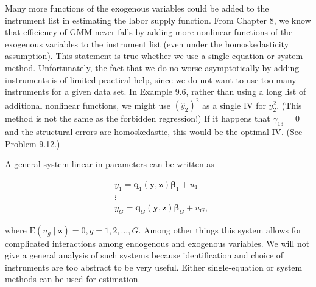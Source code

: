 \documentclass[10pt]{article}
\begin{document}
Many more functions of the exogenous variables could be added to the instrument list in estimating the labor supply function. From Chapter 8, we know that efficiency of GMM never falls by adding more nonlinear functions of the exogenous variables to the instrument list (even under the homoskedasticity assumption). This statement is true whether we use a single-equation or system method. Unfortunately, the fact that we do no worse asymptotically by adding instruments is of limited practical help, since we do not want to use too many instruments for a given data set. In Example 9.6, rather than using a long list of additional nonlinear functions, we might use $\left(\hat{y}_{2}\right)^{2}$ as a single IV for $y_{2}^{2}$. (This method is not the same as the forbidden regression!) If it happens that $\gamma_{13}=0$ and the structural errors are homoskedastic, this would be the optimal IV. (See Problem 9.12.)

A general system linear in parameters can be written as


\begin{align*}
& y_{1}=\mathbf{q}_{1}(\mathbf{y}, \mathbf{z}) \boldsymbol{\beta}_{1}+u_{1} \\
& \vdots  \tag{9.63}\\
& y_{G}=\mathbf{q}_{G}(\mathbf{y}, \mathbf{z}) \boldsymbol{\beta}_{G}+u_{G},
\end{align*}


where $\mathrm{E}\left(u_{g} \mid \mathbf{z}\right)=0, g=1,2, \ldots, G$. Among other things this system allows for complicated interactions among endogenous and exogenous variables. We will not give a general analysis of such systems because identification and choice of instruments are too abstract to be very useful. Either single-equation or system methods can be used for estimation.
\end{document}
